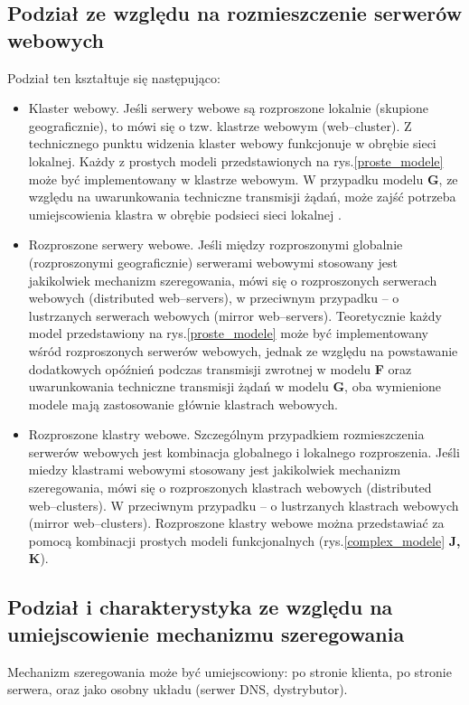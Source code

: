 \subsection{Podział ze względu na rozmieszczenie serwerów webowych}
Podział ten kształtuje się następująco:
\begin{itemize}
\item Klaster webowy. Jeśli serwery webowe są rozproszone lokalnie (skupione geograficznie), to mówi się o tzw. klastrze 
webowym (web--cluster). Z technicznego punktu widzenia klaster webowy funkcjonuje w obrębie sieci lokalnej. Każdy z prostych 
modeli przedstawionych na rys.\ref{proste_modele} może być implementowany w klastrze webowym. W przypadku modelu {\bf G}, ze względu na uwarunkowania 
techniczne transmisji żądań, może zajść potrzeba umiejscowienia klastra w obrębie podsieci sieci 
lokalnej \cite{modele15,modele20,LoadBalancingWithND}.
\item Rozproszone serwery webowe. Jeśli między rozproszonymi globalnie (rozproszonymi geograficznie) serwerami webowymi 
stosowany jest jakikolwiek mechanizm szeregowania, mówi się o rozproszonych serwerach webowych (distributed web--servers), w 
przeciwnym przypadku -- o lustrzanych serwerach webowych (mirror web--servers). Teoretycznie każdy model przedstawiony na rys.\ref{proste_modele}
może być implementowany wśród rozproszonych serwerów webowych, jednak ze względu na powstawanie dodatkowych opóźnień podczas 
transmisji zwrotnej w modelu {\bf F} oraz uwarunkowania techniczne transmisji żądań w modelu {\bf G}, oba wymienione modele mają 
zastosowanie głównie klastrach webowych.
\item Rozproszone klastry webowe. Szczególnym przypadkiem rozmieszczenia serwerów webowych jest kombinacja globalnego i 
lokalnego rozproszenia. Jeśli miedzy klastrami webowymi stosowany jest jakikolwiek mechanizm szeregowania, mówi się o 
rozproszonych klastrach webowych (distributed web--clusters). W przeciwnym przypadku -- o lustrzanych klastrach webowych (mirror 
web--clusters). Rozproszone klastry webowe można przedstawiać za pomocą kombinacji prostych modeli funkcjonalnych (rys.\ref{complex_modele} {\bf J, K}). 
\end{itemize}

\subsection{Podział i charakterystyka ze względu na umiejscowienie mechanizmu szeregowania}

Mechanizm szeregowania może być umiejscowiony: po stronie klienta, po stronie serwera, oraz jako osobny układu (serwer DNS,
dystrybutor).

